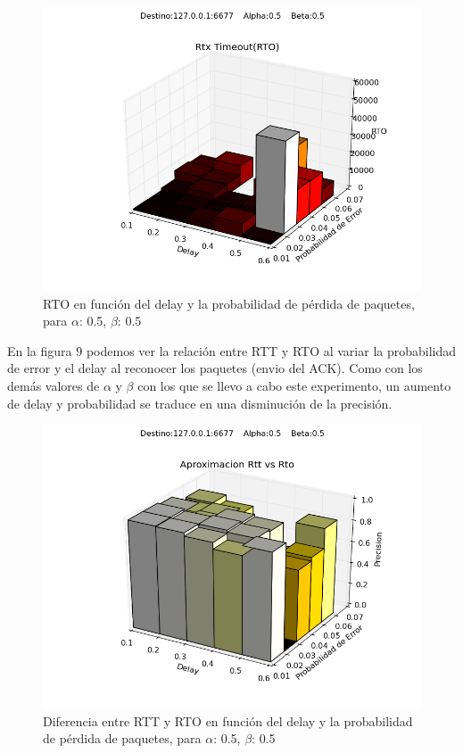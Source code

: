\begin{figure}[H]
  \centering	
	\includegraphics[scale=0.5]{../analisis/graficos_tablas/graficos_en_funcion_de_delay_probaerror/0.5-0.5/rto.png}
  \caption{RTO en función del delay y la probabilidad de pérdida de paquetes, para $\alpha$: 0.5, $\beta$: 0.5}
	\label{fig:histo-src-sitiotrabajo}
\end{figure}

En la figura $9$ podemos ver la relación entre RTT y RTO al variar la probabilidad de error y el delay al reconocer los paquetes (envio del ACK). Como con los demás valores de $\alpha$ y $\beta$ con los que se llevo a cabo este experimento, un aumento de delay y probabilidad se traduce en una disminución de la precisión. 

\begin{figure}[H]
  \centering	
	\includegraphics[scale=0.5]{../analisis/graficos_tablas/graficos_en_funcion_de_delay_probaerror/0.5-0.5/rtt_vs_rto.png}
  \caption{Diferencia entre RTT y RTO en funci\'on del delay y la probabilidad de pérdida de paquetes, para $\alpha$: 0.5, $\beta$: 0.5}
	\label{fig:histo-src-sitiotrabajo}
\end{figure}









